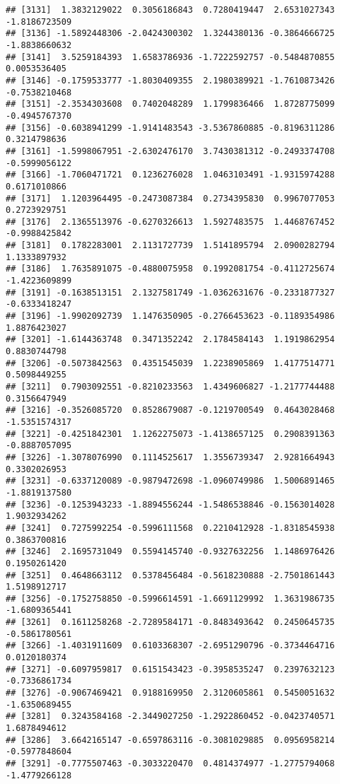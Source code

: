 \documentclass[
]{article}
\begin{document}
\begin{verbatim}
## [3131]  1.3832129022  0.3056186843  0.7280419447  2.6531027343 -1.8186723509
## [3136] -1.5892448306 -2.0424300302  1.3244380136 -0.3864666725 -1.8838660632
## [3141]  3.5259184393  1.6583786936 -1.7222592757 -0.5484870855  0.0053536405
## [3146] -0.1759533777 -1.8030409355  2.1980389921 -1.7610873426 -0.7538210468
## [3151] -2.3534303608  0.7402048289  1.1799836466  1.8728775099 -0.4945767370
## [3156] -0.6038941299 -1.9141483543 -3.5367860885 -0.8196311286  0.3214798636
## [3161] -1.5998067951 -2.6302476170  3.7430381312 -0.2493374708 -0.5999056122
## [3166] -1.7060471721  0.1236276028  1.0463103491 -1.9315974288  0.6171010866
## [3171]  1.1203964495 -0.2473087384  0.2734395830  0.9967077053  0.2723929751
## [3176]  2.1365513976 -0.6270326613  1.5927483575  1.4468767452 -0.9988425842
## [3181]  0.1782283001  2.1131727739  1.5141895794  2.0900282794  1.1333897932
## [3186]  1.7635891075 -0.4880075958  0.1992081754 -0.4112725674 -1.4223609899
## [3191] -0.1638513151  2.1327581749 -1.0362631676 -0.2331877327 -0.6333418247
## [3196] -1.9902092739  1.1476350905 -0.2766453623 -0.1189354986  1.8876423027
## [3201] -1.6144363748  0.3471352242  2.1784584143  1.1919862954  0.8830744798
## [3206] -0.5073842563  0.4351545039  1.2238905869  1.4177514771  0.5098449255
## [3211]  0.7903092551 -0.8210233563  1.4349606827 -1.2177744488  0.3156647949
## [3216] -0.3526085720  0.8528679087 -0.1219700549  0.4643028468 -1.5351574317
## [3221] -0.4251842301  1.1262275073 -1.4138657125  0.2908391363 -0.8887057095
## [3226] -1.3078076990  0.1114525617  1.3556739347  2.9281664943  0.3302026953
## [3231] -0.6337120089 -0.9879472698 -1.0960749986  1.5006891465 -1.8819137580
## [3236] -0.1253943233 -1.8894556244 -1.5486538846 -0.1563014028  1.9032934262
## [3241]  0.7275992254 -0.5996111568  0.2210412928 -1.8318545938  0.3863700816
## [3246]  2.1695731049  0.5594145740 -0.9327632256  1.1486976426  0.1950261420
## [3251]  0.4648663112  0.5378456484 -0.5618230888 -2.7501861443  1.5198912717
## [3256] -0.1752758850 -0.5996614591 -1.6691129992  1.3631986735 -1.6809365441
## [3261]  0.1611258268 -2.7289584171 -0.8483493642  0.2450645735 -0.5861780561
## [3266] -1.4031911609  0.6103368307 -2.6951290796 -0.3734464716  0.0120180374
## [3271] -0.6097959817  0.6151543423 -0.3958535247  0.2397632123 -0.7336861734
## [3276] -0.9067469421  0.9188169950  2.3120605861  0.5450051632 -1.6350689455
## [3281]  0.3243584168 -2.3449027250 -1.2922860452 -0.0423740571  1.6878494612
## [3286]  3.6642165147 -0.6597863116 -0.3081029885  0.0956958214 -0.5977848604
## [3291] -0.7775507463 -0.3033220470  0.4814374977 -1.2775794068 -1.4779266128

\end{verbatim}
\end{document}
